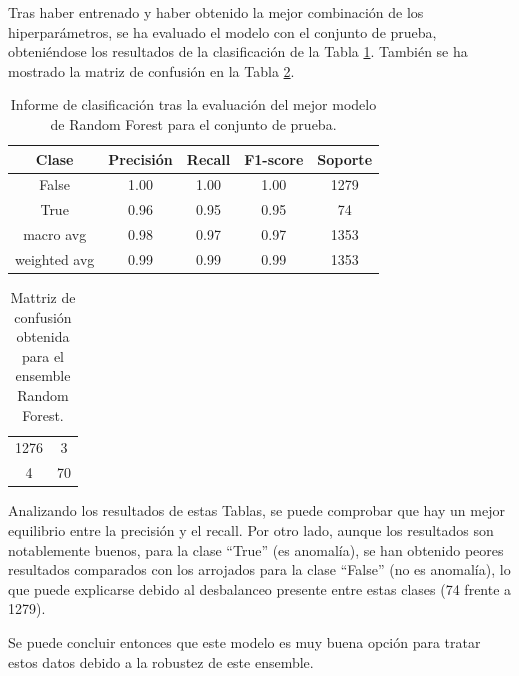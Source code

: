 \documentclass[12pt,letterpaper]{article}
\begin{document}
Tras haber entrenado y haber obtenido la mejor combinación de los hiperparámetros, se ha evaluado el modelo con el conjunto de prueba, obteniéndose los resultados de la clasificación de la Tabla \ref{tab:res-RF}. También se ha mostrado la matriz de confusión en la Tabla \ref{tab:confusion-RF}.
\begin{table}[H]
    \centering
    \begin{tabular}{ccccc}
    \hline
    \textbf{Clase} & \textbf{Precisión} & \textbf{Recall} & \textbf{F1-score} & \textbf{Soporte} \\ \hline
    False & 1.00 & 1.00 & 1.00 & 1279 \\ 
    True & 0.96 & 0.95 & 0.95 & 74 \\ 
    macro avg & 0.98 & 0.97 & 0.97 & 1353 \\ 
    weighted avg & 0.99 & 0.99 & 0.99 & 1353 \\ \hline
    \end{tabular}
    \caption{Informe de clasificación tras la evaluación del mejor modelo de Random Forest para el conjunto de prueba.}
    \label{tab:res-RF}
\end{table}

\begin{table}[H]
    \centering
    \begin{tabular}{|cc|}
    \hline
    1276 & 3 \\
    4 & 70 \\ \hline
    \end{tabular}
    \caption{Mattriz de confusión obtenida para el ensemble Random Forest.}
    \label{tab:confusion-RF}
\end{table}

Analizando los resultados de estas Tablas, se puede comprobar que hay un mejor equilibrio entre la precisión y el recall. Por otro lado, aunque los resultados son notablemente buenos, para la clase ``True'' (es anomalía), se han obtenido peores resultados comparados con los arrojados para la clase ``False'' (no es anomalía), lo que puede explicarse debido al desbalanceo presente entre estas clases (74 frente a 1279).

Se puede concluir entonces que este modelo es muy buena opción para tratar estos datos debido a la robustez de este ensemble.
\end{document}

